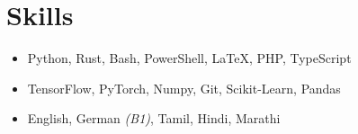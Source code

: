 %

\section*{Skills}
\begin{itemize}
\setlength{\itemsep}{0mm}

\item {}\iftoggle{onepage}{\\}{ }Python, Rust, Bash, PowerShell, \LaTeX, PHP, TypeScript
\item {}\iftoggle{onepage}{\\}{ }TensorFlow, PyTorch, Numpy, Git, Scikit-Learn, Pandas
\item {}\iftoggle{onepage}{\\}{ }English, German \textit{\textcolor{misc}{(B1)}}, Tamil, Hindi, Marathi

\end{itemize}
